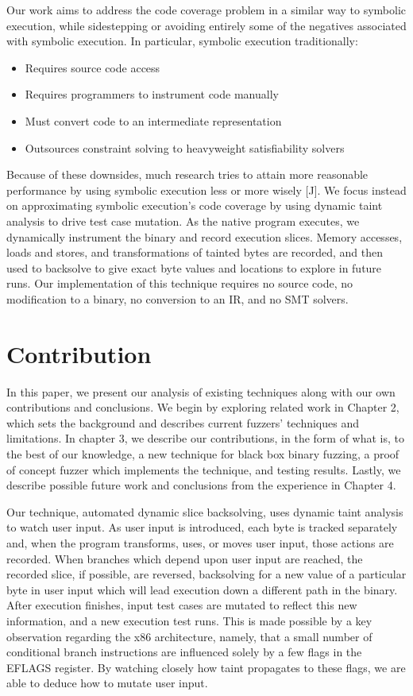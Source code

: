 \documentclass[11pt,expanded,copyright]{fsuthesis}
\begin{document}
Our work aims to address the code coverage problem in a similar way to symbolic execution, while sidestepping or avoiding entirely some of the negatives associated with symbolic execution. In particular, symbolic execution traditionally:

\begin{itemize}
	\item Requires source code access
	\item Requires programmers to instrument code manually
	\item Must convert code to an intermediate representation
	\item Outsources constraint solving to heavyweight satisfiability solvers
\end{itemize}

Because of these downsides, much research tries to attain more reasonable performance by using symbolic execution less or more wisely [J]. We focus instead on approximating symbolic execution's code coverage by using dynamic taint analysis to drive test case mutation. As the native program executes, we dynamically instrument the binary and record execution slices. Memory accesses, loads and stores, and transformations of tainted bytes are recorded, and then used to backsolve to give exact byte values and locations to explore in future runs. Our implementation of this technique requires no source code, no modification to a binary, no conversion to an IR, and no SMT solvers.

\section{Contribution}

In this paper, we present our analysis of existing techniques along with our own contributions and conclusions. We begin by exploring related work in Chapter 2, which sets the background and describes current fuzzers' techniques and limitations. In chapter 3, we describe our contributions, in the form of what is, to the best of our knowledge, a new technique for black box binary fuzzing, a proof of concept fuzzer which implements the technique, and testing results. Lastly, we describe possible future work and conclusions from the experience in Chapter 4.

Our technique, automated dynamic slice backsolving, uses dynamic taint analysis to watch user input. As user input is introduced, each byte is tracked separately and, when the program transforms, uses, or moves user input, those actions are recorded. When branches which depend upon user input are reached, the recorded slice, if possible, are reversed, backsolving for a new value of a particular byte in user input which will lead execution down a different path in the binary. After execution finishes, input test cases are mutated to reflect this new information, and a new execution test runs. This is made possible by a key observation regarding the x86 architecture, namely, that a small number of conditional branch instructions are influenced solely by a few flags in the EFLAGS register. By watching closely how taint propagates to these flags, we are able to deduce how to mutate user input.
\end{document}
